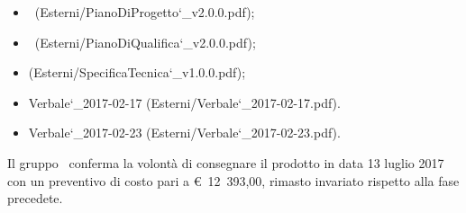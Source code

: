 \documentclass[a4paper,12pt]{article}
\begin{document}
\begin{titlepage}
\begin{itemize}
			\item \pianodiprogettoRP\ (Esterni/PianoDiProgetto\char`_v2.0.0.pdf);
			\item \pianodiqualificaRP\ (Esterni/PianoDiQualifica\char`_v2.0.0.pdf);
			\item \specificatecnicaRP (Esterni/SpecificaTecnica\char`_v1.0.0.pdf);			
			\item Verbale\char`_2017-02-17 (Esterni/Verbale\char`_2017-02-17.pdf).
			\item Verbale\char`_2017-02-23 (Esterni/Verbale\char`_2017-02-23.pdf).
		\end{itemize}	
		Il gruppo \kaleidoscode\ conferma la volontà di consegnare il prodotto in data 13 luglio 2017
		 con un preventivo di costo pari a \hbox{\euro\ 12 393,00},
		  rimasto invariato rispetto alla fase precedete.\\ 
		

\end{titlepage}
\end{document}
